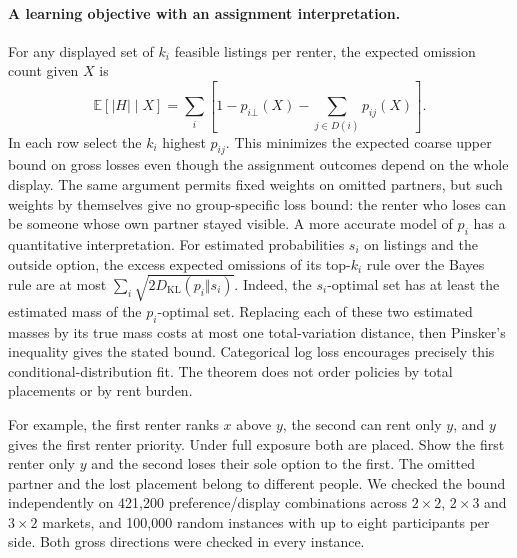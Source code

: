 \paragraph{A learning objective with an assignment interpretation.}
For any displayed set of $k_i$ feasible listings per renter, the expected omission count given $X$ is
\[
 \mathbb E[|H|\mid X]=\sum_i\left[1-p_{i\bot}(X)-\sum_{j\in D(i)}p_{ij}(X)\right].
\]
In each row select the $k_i$ highest $p_{ij}$. This minimizes the expected coarse upper bound on gross losses even though the assignment outcomes depend on the whole display. The same argument permits fixed weights on omitted partners, but such weights by themselves give no group-specific loss bound: the renter who loses can be someone whose own partner stayed visible. A more accurate model of $p_i$ has a quantitative interpretation. For estimated probabilities $s_i$ on listings and the outside option, the excess expected omissions of its top-$k_i$ rule over the Bayes rule are at most $\sum_i\sqrt{2D_{\mathrm{KL}}(p_i\Vert s_i)}$. Indeed, the $s_i$-optimal set has at least the estimated mass of the $p_i$-optimal set. Replacing each of these two estimated masses by its true mass costs at most one total-variation distance, then Pinsker's inequality gives the stated bound. Categorical log loss encourages precisely this conditional-distribution fit. The theorem does not order policies by total placements or by rent burden.

For example, the first renter ranks $x$ above $y$, the second can rent only $y$, and $y$ gives the first renter priority. Under full exposure both are placed. Show the first renter only $y$ and the second loses their sole option to the first. The omitted partner and the lost placement belong to different people. We checked the bound independently on 421,200 preference/display combinations across $2\times2$, $2\times3$ and $3\times2$ markets, and 100,000 random instances with up to eight participants per side. Both gross directions were checked in every instance.
